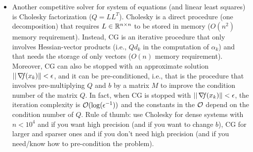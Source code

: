 \documentclass[10pt,a4paper]{article}
\begin{document}
\begin{remark}
\begin{itemize}
\begin{align*}
			\beta_{k+1}^{\text{DY}} &= \frac{\|\grad(x_{k+1})\|^2}{d_k^T y_k} &&\text{(Dai-Yuan)}.
		\end{align*}
		\item Another competitive solver for system of equations (and linear least squares) is Cholesky factorization ($Q=LL^T$). Cholesky is a direct procedure (one decomposition) that requires $L\in \mathbb{R}^{n\times n}$ to be stored in memory ($O(n^2)$ memory requirement). Instead, CG is an iterative procedure that only involves Hessian-vector products (i.e., $Qd_k$ in the computation of $\alpha_k$) and that needs the storage of only vectors ($O(n)$ memory requirement). Moreover, CG can also be stopped with an approximate solution $||\operatorname*{\mathit{\nabla \!f}}(x_k)\|<\epsilon$, and it can be pre-conditioned, i.e., that is the procedure that involves pre-multiplying $Q$ and $b$ by a matrix $M$ to improve the condition number of the matrix $Q$. In fact, when CG is stopped with $||\operatorname*{\mathit{\nabla \!f}}(x_k)\|<\epsilon$, the iteration complexity is $\mathcal{O}(\log(\epsilon^{-1}))$ and the constants in the $\mathcal{O}$ depend on the condition number of $Q$. Rule of thumb: use Cholesky for dense systems with $n<10^4$ and if you want high precision (and if you want to change $b$), CG for larger and sparser ones and if you don't need high precision (and if you need/know how to pre-condition the problem).
	\end{itemize}
\end{remark}


\end{document}
